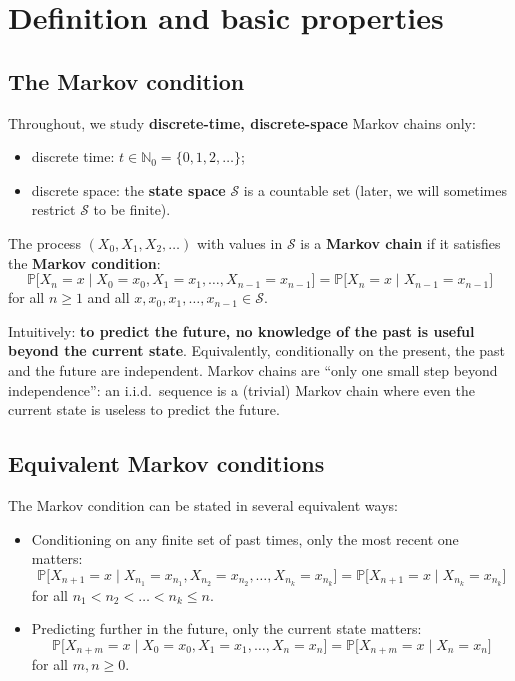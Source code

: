 \section{Definition and basic properties}

\subsection{The Markov condition}

Throughout, we study \textbf{discrete-time, discrete-space} Markov chains only:
\begin{itemize}
    \item discrete time: $t \in \mathbb{N}_0 = \{0, 1, 2, \dots\}$;
    \item discrete space: the \textbf{state space} $\mathcal{S}$ is a countable set (later, we will sometimes restrict $\mathcal{S}$ to be finite).
\end{itemize}

\begin{definition}
The process $(X_0, X_1, X_2, \dots)$ with values in $\mathcal{S}$ is a \textbf{Markov chain} if it satisfies the \textbf{Markov condition}:
\[
\mathbb{P}\big[X_n = x \mid X_0 = x_0, X_1 = x_1, \dots, X_{n-1} = x_{n-1}\big] = \mathbb{P}\big[X_n = x \mid X_{n-1} = x_{n-1}\big]
\]
for all $n \geq 1$ and all $x, x_0, x_1, \dots, x_{n-1} \in \mathcal{S}$.
\end{definition}

Intuitively: \textbf{to predict the future, no knowledge of the past is useful beyond the current state}. Equivalently, conditionally on the present, the past and the future are independent. Markov chains are ``only one small step beyond independence'': an i.i.d.\ sequence is a (trivial) Markov chain where even the current state is useless to predict the future.

\subsection{Equivalent Markov conditions}

The Markov condition can be stated in several equivalent ways:
\begin{itemize}
    \item Conditioning on any finite set of past times, only the most recent one matters:
    \[
    \mathbb{P}\big[X_{n+1} = x \mid X_{n_1} = x_{n_1}, X_{n_2} = x_{n_2}, \dots, X_{n_k} = x_{n_k}\big] = \mathbb{P}\big[X_{n+1} = x \mid X_{n_k} = x_{n_k}\big]
    \]
    for all $n_1 < n_2 < \dots < n_k \leq n$.
    \item Predicting further in the future, only the current state matters:
    \[
    \mathbb{P}\big[X_{n+m} = x \mid X_0 = x_0, X_1 = x_1, \dots, X_n = x_n\big] = \mathbb{P}\big[X_{n+m} = x \mid X_n = x_n\big]
    \]
    for all $m, n \geq 0$.
\end{itemize}

